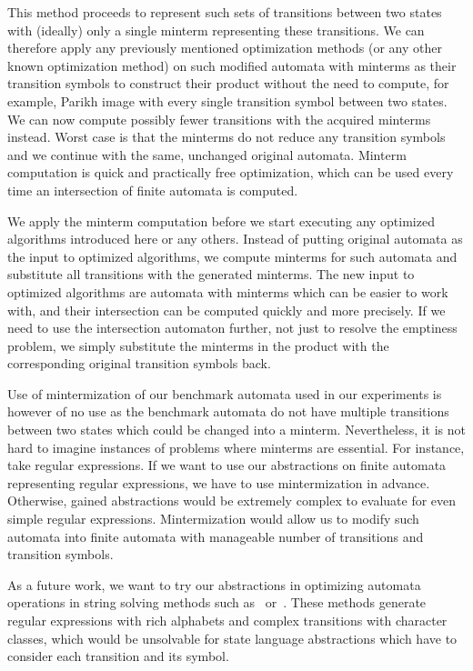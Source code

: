 This method proceeds to represent such sets of transitions between two states with (ideally) only a single minterm representing these transitions. We can therefore apply any previously mentioned optimization methods (or any other known optimization method) on such modified automata with minterms as their transition symbols to construct their product without the need to compute, for example, Parikh image with every single transition symbol between two states. We can now compute possibly fewer transitions with the acquired minterms instead. Worst case is that the minterms do not reduce any transition symbols and we continue with the same, unchanged original automata. Minterm computation is quick and practically free optimization, which can be used every time an intersection of finite automata is computed.

We apply the minterm computation before we start executing any optimized algorithms introduced here or any others. Instead of putting original automata as the input to optimized algorithms, we compute minterms for such automata and substitute all transitions with the generated minterms. The new input to optimized algorithms are automata with minterms which can be easier to work with, and their intersection can be computed quickly and more precisely. If we need to use the intersection automaton further, not just to resolve the emptiness problem, we simply substitute the minterms in the product with the corresponding original transition symbols back.

Use of mintermization of our benchmark automata used in our experiments is however of no use as the benchmark automata do not have multiple transitions between two states which could be changed into a minterm. Nevertheless, it is not hard to imagine instances of problems where minterms are essential. For instance, take regular expressions. If we want to use our abstractions on finite automata representing regular expressions, we have to use mintermization in advance. Otherwise, gained abstractions would be extremely complex to evaluate for even simple regular expressions. Mintermization would allow us to modify such automata into finite automata with manageable number of transitions and transition symbols.

As a future work, we want to try our abstractions in optimizing automata operations in string solving methods such as~\cite{10.1007/978-3-319-08867-9_10} or~\cite{DBLP:conf/popl/LinB17}. These methods generate regular expressions with rich alphabets and complex transitions with character classes, which would be unsolvable for state language abstractions which have to consider each transition and its symbol.

